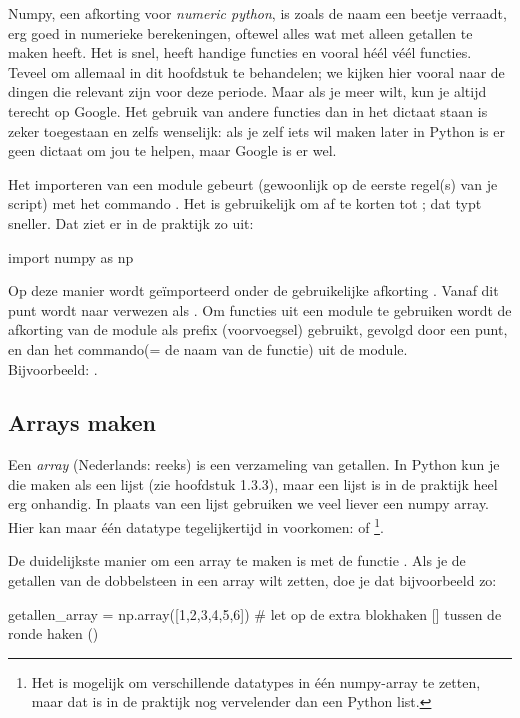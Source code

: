 \documentclass[a4paper,11pt, fleqn]{article}
\begin{document}
Numpy, een afkorting voor {\it numeric python}, is zoals de naam een beetje verraadt, erg goed in numerieke berekeningen, oftewel alles wat met alleen getallen te maken heeft. Het is snel, heeft handige functies en vooral h\'e\'el v\'e\'el functies. Teveel om allemaal in dit hoofdstuk te behandelen; we kijken hier vooral naar de dingen die relevant zijn voor deze periode. Maar als je meer wilt, kun je altijd terecht op Google. Het gebruik van andere functies dan in het dictaat staan is zeker toegestaan en zelfs wenselijk: als je zelf iets wil maken later in Python is er geen dictaat om jou te helpen, maar Google is er wel.

Het importeren van een module gebeurt (gewoonlijk op de eerste regel(s) van je script) met het commando . Het is gebruikelijk om  af te korten tot ; dat typt sneller. Dat ziet er in de praktijk zo uit: 
\begin{python}
import numpy as np
\end{python}
Op deze manier wordt  ge\"importeerd onder de gebruikelijke afkorting . Vanaf dit punt wordt naar  verwezen als . Om functies uit een module te gebruiken wordt de afkorting van de module als prefix (voorvoegsel) gebruikt, gevolgd door een punt, en dan het commando(= de naam van de functie) uit de module. \\
Bijvoorbeeld: .

\subsection{Arrays maken}
Een {\it array} (Nederlands: reeks) is een verzameling van getallen. In Python kun je die maken als een lijst (zie hoofdstuk 1.3.3), maar een lijst is in de praktijk heel erg onhandig. In plaats van een lijst gebruiken we veel liever een numpy array. Hier kan maar \'e\'en datatype tegelijkertijd in voorkomen:  of \footnote{Het is mogelijk om verschillende datatypes in \'e\'en numpy-array te zetten, maar dat is in de praktijk nog vervelender dan een Python list.}.

De duidelijkste manier om een array te maken is met de functie . Als je de getallen van de dobbelsteen in een array wilt zetten, doe je dat bijvoorbeeld zo:
\begin{python}
getallen_array = np.array([1,2,3,4,5,6]) 
# let op de extra blokhaken [] tussen de ronde haken ()
\end{python}
\end{document}
